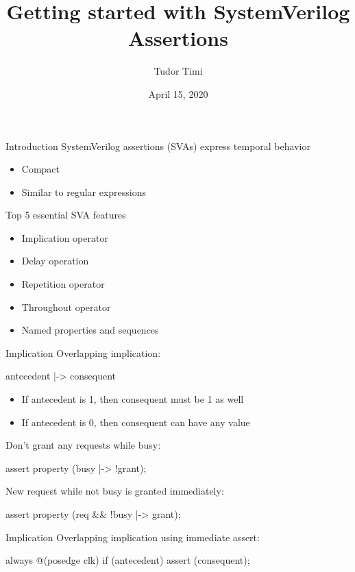 \documentclass{beamer}
\title{Getting started with SystemVerilog Assertions}
\author{Tudor Timi}
\institute{VerificationGentleman.com}
\date{April 15, 2020}
\begin{document}
\begin{frame}
\titlepage
\end{frame}


\begin{frame}{Introduction}
SystemVerilog assertions (SVAs) express temporal behavior

\begin{itemize}
 \item Compact
 \item Similar to regular expressions
\end{itemize}
\end{frame}


\begin{frame}{Top 5 essential SVA features}
\begin{itemize}
 \item Implication operator
 \item Delay operation
 \item Repetition operator
 \item Throughout operator
 \item Named properties and sequences
\end{itemize}
\end{frame}


\begin{frame}{Implication}
Overlapping implication:

\begin{semiverbatim}
antecedent |-> consequent
\end{semiverbatim}

\begin{itemize}
 \item If antecedent is 1, then consequent must be 1 as well
 \item If antecedent is 0, then consequent can have any value
\end{itemize}

\pause
Don't grant any requests while busy:
\begin{semiverbatim}
assert property (busy |-> !grant);
\end{semiverbatim}

\pause
New request while not busy is granted immediately:
\begin{semiverbatim}
assert property (req \&\& !busy |-> grant);
\end{semiverbatim}
\end{frame}


\begin{frame}[fragile]{Implication}
Overlapping implication using immediate assert:

\begin{semiverbatim}
always @(posedge clk)
  if (antecedent)
    assert (consequent);
\end{semiverbatim}
\end{frame}
\end{document}
